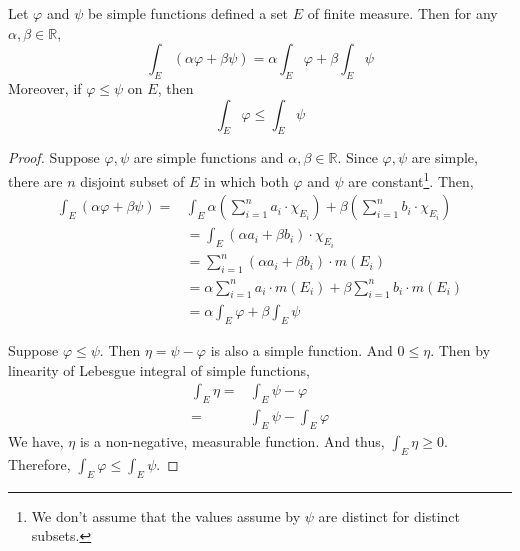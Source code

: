 \begin{theorem}
	Let $\varphi$ and $\psi$ be simple functions defined a set $E$ of finite measure.
	Then for any $\alpha,\beta \in \mathbb{R}$,
	\begin{equation}
		\int_E (\alpha\varphi + \beta\psi) = \alpha \int_E \varphi + \beta \int_E \psi
	\end{equation}
	Moreover, if $\varphi \le \psi$ on $E$, then
	\begin{equation}
		\int_E \varphi \le \int_E \psi
	\end{equation}
\end{theorem}
\begin{proof}
	Suppose $\varphi,\psi$ are simple functions and $\alpha,\beta \in \mathbb{R}$.
	Since $\varphi,\psi$ are simple, there are $n$ disjoint subset of $E$ in which both $\varphi$ and $\psi$ are constant\dag\footnote{
		We don't assume that the values assume by $\psi$ are distinct for distinct subsets.}.
	Then,
	\begin{align*}
		\int_E (\alpha \varphi + \beta \psi) = & \int_E \alpha \left( \sum_{i=1}^n a_i \cdot \chi_{E_i} \right) + \beta \left( \sum_{i=1}^n b_i \cdot \chi_{E_i} \right) \\
		& = \int_E (\alpha a_i + \beta b_i) \cdot \chi_{E_i} \\
		& = \sum_{i = 1}^n (\alpha a_i + \beta b_i) \cdot m(E_i) \\
		& = \alpha \sum_{i=1}^n a_i \cdot m(E_i) + \beta \sum_{i=1}^n b_i \cdot m(E_i) \\
		&= \alpha \int_E \varphi + \beta \int_E \psi
	\end{align*}

	Suppose $\varphi \le \psi$.
	Then $\eta = \psi - \varphi$ is also a simple function.
	And $0 \le \eta$.
	Then by linearity of Lebesgue integral of simple functions,
	\begin{align*}
		\int_E \eta = & \int_E \psi - \varphi \\
		= &  \int_E \psi - \int_E \varphi 
	\end{align*}
	We have, $\eta$ is a non-negative, measurable function.
	And thus, $\int_E \eta \ge 0$.
	Therefore, $\int_E \varphi \le \int_E \psi$.
\end{proof}


